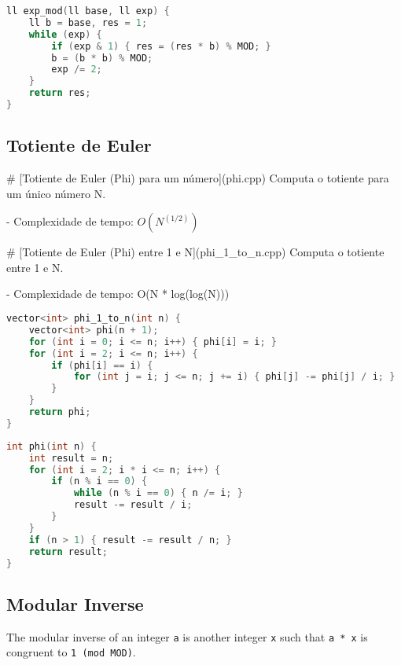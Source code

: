 \documentclass[11pt, a4paper, twoside]{article}
\begin{document}
\begin{multicols}{2}
\begin{lstlisting}[language=C++]
ll exp_mod(ll base, ll exp) {
    ll b = base, res = 1;
    while (exp) {
        if (exp & 1) { res = (res * b) % MOD; }
        b = (b * b) % MOD;
        exp /= 2;
    }
    return res;
}
\end{lstlisting}
\end{multicols}

\subsection{Totiente de Euler}



\# [Totiente de Euler (Phi) para um número](phi.cpp)
Computa o totiente para um único número N.

- Complexidade de tempo: $O(N^(1/2))$

\# [Totiente de Euler (Phi) entre 1 e N](phi\_1\_to\_n.cpp)
Computa o totiente entre 1 e N.

- Complexidade de tempo: O(N * log(log(N)))

\begin{lstlisting}[language=C++]
vector<int> phi_1_to_n(int n) {
    vector<int> phi(n + 1);
    for (int i = 0; i <= n; i++) { phi[i] = i; }
    for (int i = 2; i <= n; i++) {
        if (phi[i] == i) {
            for (int j = i; j <= n; j += i) { phi[j] -= phi[j] / i; }
        }
    }
    return phi;
}
\end{lstlisting}

\begin{multicols}{2}
\begin{lstlisting}[language=C++]
int phi(int n) {
    int result = n;
    for (int i = 2; i * i <= n; i++) {
        if (n % i == 0) {
            while (n % i == 0) { n /= i; }
            result -= result / i;
        }
    }
    if (n > 1) { result -= result / n; }
    return result;
}
\end{lstlisting}
\end{multicols}

\subsection{Modular Inverse}


The modular inverse of an integer \lstinline{a} is another integer \lstinline{x} such that \lstinline{a * x} is congruent to \lstinline{1 (mod MOD)}.
\end{document}
